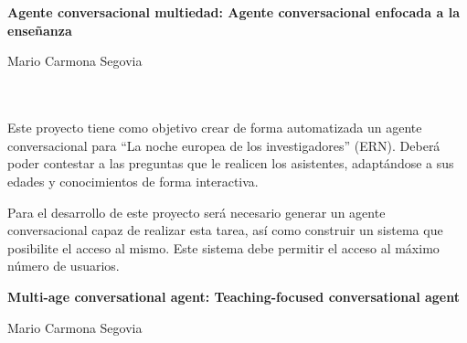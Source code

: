 \chapter*{}


\thispagestyle{empty}

\begin{center}
{\large\bfseries Agente conversacional multiedad: Agente conversacional enfocada a la enseñanza}\\
\end{center}
\begin{center}
Mario Carmona Segovia\\
\end{center}

\\

\vspace{0.7cm}
\\

Este proyecto tiene como objetivo crear de forma automatizada un agente conversacional para ``La noche europea de los investigadores'' (ERN). Deberá poder contestar a las preguntas que le realicen los asistentes, adaptándose a sus edades y conocimientos de forma interactiva.

Para el desarrollo de este proyecto será necesario generar un agente conversacional capaz de realizar esta tarea, así como construir un sistema que posibilite el acceso al mismo. Este sistema debe permitir el acceso al máximo número de usuarios.
\cleardoublepage


\thispagestyle{empty}


\begin{center}
{\large\bfseries Multi-age conversational agent: Teaching-focused conversational agent}\\
\end{center}
\begin{center}
Mario Carmona Segovia\\
\end{center}

\\

